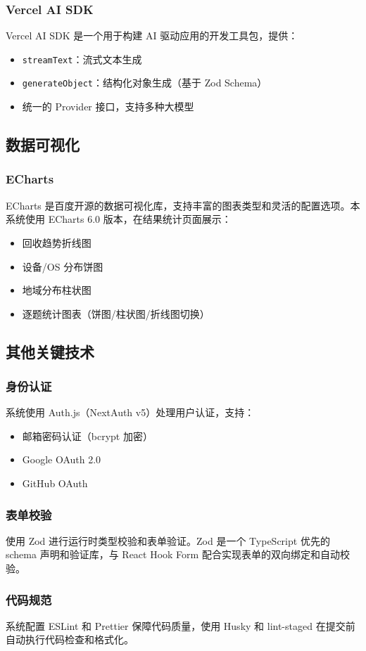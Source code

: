 \subsubsection{Vercel AI SDK}

Vercel AI SDK 是一个用于构建 AI 驱动应用的开发工具包，提供：

\begin{itemize}
  \item \texttt{streamText}：流式文本生成
  \item \texttt{generateObject}：结构化对象生成（基于 Zod Schema）
  \item 统一的 Provider 接口，支持多种大模型
\end{itemize}

\subsection{数据可视化}

\subsubsection{ECharts}

ECharts 是百度开源的数据可视化库，支持丰富的图表类型和灵活的配置选项。本系统使用 ECharts 6.0 版本，在结果统计页面展示：

\begin{itemize}
  \item 回收趋势折线图
  \item 设备/OS 分布饼图
  \item 地域分布柱状图
  \item 逐题统计图表（饼图/柱状图/折线图切换）
\end{itemize}

\subsection{其他关键技术}

\subsubsection{身份认证}

系统使用 Auth.js（NextAuth v5）处理用户认证，支持：

\begin{itemize}
  \item 邮箱密码认证（bcrypt 加密）
  \item Google OAuth 2.0
  \item GitHub OAuth
\end{itemize}

\subsubsection{表单校验}

使用 Zod 进行运行时类型校验和表单验证。Zod 是一个 TypeScript 优先的 schema 声明和验证库，与 React Hook Form 配合实现表单的双向绑定和自动校验。

\subsubsection{代码规范}

系统配置 ESLint 和 Prettier 保障代码质量，使用 Husky 和 lint-staged 在提交前自动执行代码检查和格式化。
